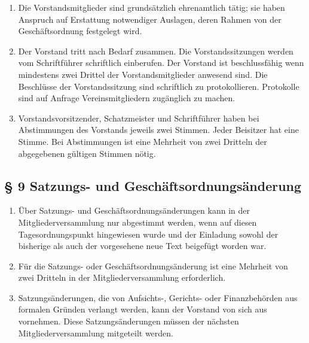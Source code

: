 ﻿\documentclass[10pt,a4paper]{scrartcl}
\begin{document}
\begin{enumerate}
        \item Die Vorstandsmitglieder sind grundsätzlich ehrenamtlich tätig; sie haben Anspruch
                auf Erstattung notwendiger Auslagen, deren Rahmen von der Geschäftsordnung
                festgelegt wird.
    \item Der Vorstand tritt nach Bedarf zusammen. Die Vorstandssitzungen
    werden vom Schriftführer schriftlich einberufen. Der Vorstand ist
    beschlussfähig wenn mindestens zwei Drittel der Vorstandsmitglieder
    anwesend sind. Die Beschlüsse der Vorstandssitzung sind schriftlich zu
    protokollieren. Protokolle sind auf Anfrage Vereinsmitgliedern zugänglich zu machen.
    \item Vorstandsvorsitzender, Schatzmeister und Schriftführer haben bei
    Abstimmungen des Vorstands jeweils zwei Stimmen. Jeder Beisitzer hat eine
    Stimme. Bei Abstimmungen ist eine Mehrheit von zwei Dritteln der
    abgegebenen gültigen Stimmen nötig.
\end{enumerate}
%
%
\subsection*{§ 9 Satzungs- und Geschäftsordnungsänderung}
\begin{enumerate}
        \item Über Satzungs- und Geschäftsordnungsänderungen kann in der Mitgliederversammlung
                nur abgestimmt werden, wenn auf diesen Tagesordnungspunkt hingewiesen wurde und der
                Einladung sowohl der bisherige als auch der vorgesehene neue Text beigefügt
                worden war.
        \item Für die Satzungs- oder Geschäftsordnungsänderung ist eine Mehrheit von zwei
                Dritteln in der Mitgliederversammlung erforderlich.
        \item Satzungsänderungen, die von Aufsichts-, Gerichts- oder Finanz\-be\-hör\-den aus formalen
                Grün\-den verlangt werden, kann der Vorstand von sich aus vornehmen. Diese
                Sat\-zungs\-än\-der\-ung\-en müs\-sen der nächs\-ten Mitgliederversammlung mitgeteilt
                werden.
\end{enumerate}
%
%
\end{document}
